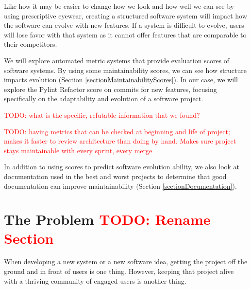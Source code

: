 \documentclass[12pt,conference]{IEEEtran}
\newcommand\todo[1]{\textcolor{red}{#1}}
\begin{document}
Like how it may be easier to change how we look and how well we can see by using prescriptive eyewear, creating a structured software system will impact how the software can evolve with new features. If a system is difficult to evolve, users will lose favor with that system as it cannot offer features that are comparable to their competitors.


We will explore automated metric systems that provide evaluation scores of software systems. By using some maintainability scores, we can see how structure impacts evolution (Section \ref{sectionMaintainabilityScores}). In our case, we will explore the Pylint Refactor score on commits for new features, focusing specifically on the adaptability and evolution of a software project.

\todo{TODO: what is the specific, refutable information that we found?}

\todo{TODO: having metrics that can be checked at beginning and life of project; makes it faster to review architecture than doing by hand. Makes sure project stays maintainable with every sprint, every merge}

In addition to using scores to predict software evolution ability, we also look at documentation used in the best and worst projects to determine that good documentation can improve maintainability (Section \ref{sectionDocumentation}).


\vspace{0.5cm}
\section{The Problem \todo{TODO: Rename Section}}
\vspace{0.25cm}


When developing a new system or a new software idea, getting the project off the ground and in front of users is one thing. However, keeping that project alive with a thriving community of engaged users is another thing.
\end{document}
